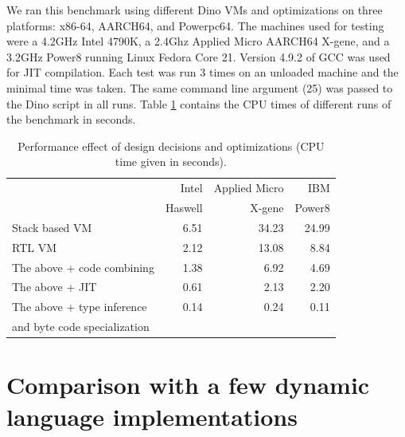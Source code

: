 \documentclass[preprint]{sigplanconf}
\begin{document}
  We ran this benchmark using different Dino VMs and optimizations on
three platforms: x86-64, AARCH64, and Powerpc64.
The machines used for testing
were a 4.2GHz Intel 4790K, a 2.4Ghz Applied Micro AARCH64 X-gene, and
a 3.2GHz Power8 running Linux Fedora Core 21.  Version 4.9.2 of GCC was used for
JIT compilation.  Each test was run 3 times on an unloaded
machine and the minimal
time was taken. The same command line argument (25) was passed to the Dino script in all runs.
Table \ref{tab:optimizations} contains the CPU times of different runs of the benchmark in seconds.

\begin{table}[h]
\begin{center}
\begin{tabular}{|l|r|r|r|}
\hline

                          & Intel         & Applied Micro    & IBM    \\
                          & Haswell       & X-gene           & Power8 \\ \hline
Stack based VM            &       6.51    & 34.23            & 24.99  \\ \hline
RTL VM                    &      2.12     & 13.08            & 8.84   \\ \hline
The above + code combining    &      1.38     & 6.92             & 4.69   \\ \hline
The above + JIT               &      0.61     & 2.13             & 2.20   \\ \hline
The above + type inference   &      0.14  & 0.24             & 0.11 \\
and byte code specialization &                &                  &    \\ \hline
\hline

\end{tabular}
\end{center}
\caption{Performance effect of design decisions and optimizations (CPU
time given in seconds).}
\label{tab:optimizations}
\end{table}

\section{Comparison with a few dynamic language implementations}
\end{document}

